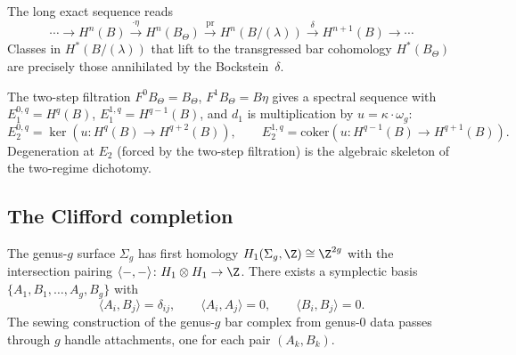 \begin{corollary}
The long exact sequence reads
\begin{equation}%
\cdots \to
H^n(B) \xrightarrow{\cdot\eta}
H^n(B_\Theta) \xrightarrow{\mathrm{pr}}
H^n(B/(\lambda)) \xrightarrow{\delta}
H^{n+1}(B) \to \cdots
\end{equation}
Classes in $H^*(B/(\lambda))$ that lift to the transgressed bar
cohomology $H^*(B_\Theta)$ are precisely those annihilated
by the Bockstein~$\delta$.
\end{corollary}

\begin{remark}
The two-step filtration $F^0 B_\Theta = B_\Theta$,
$F^1 B_\Theta = B\eta$ gives a spectral sequence with
$E_1^{0,q} = H^q(B)$, $E_1^{1,q} = H^{q-1}(B)$, and
$d_1$ is multiplication by $u = \kappa \cdot \omega_g$:
\[
E_2^{0,q} = \ker(u\colon H^q(B) \to H^{q+2}(B)),
\qquad
E_2^{1,q} = \mathrm{coker}(u\colon H^{q-1}(B) \to H^{q+1}(B)).
\]
Degeneration at $E_2$ (forced by the two-step filtration) is the
algebraic skeleton of the two-regime dichotomy.
\end{remark}

%
%

\subsection{The Clifford completion}

The genus-$g$ surface $\Sigma_g$ has first homology
$H_1(\Sigma_g, \Z) \cong \Z^{2g}$ with the intersection pairing
$\langle -, - \rangle\colon H_1 \otimes H_1 \to \Z$.
There exists a symplectic basis $\{A_1, B_1, \ldots, A_g, B_g\}$ with
\begin{equation}%
\langle A_i, B_j \rangle = \delta_{ij},
\qquad
\langle A_i, A_j \rangle = 0,
\qquad
\langle B_i, B_j \rangle = 0.
\end{equation}
The sewing construction of the genus-$g$ bar complex from genus-$0$
data passes through $g$ handle attachments, one for each pair
$(A_k, B_k)$.

